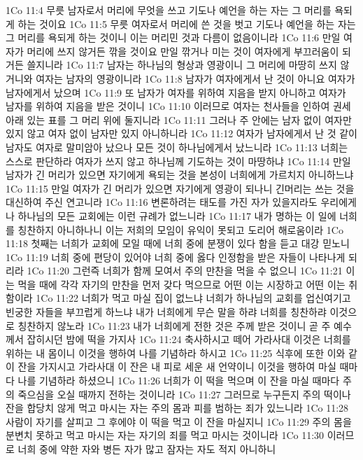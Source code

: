 1Co 11:4  무릇 남자로서 머리에 무엇을 쓰고 기도나 예언을 하는 자는 그 머리를 욕되게 하는 것이요
1Co 11:5  무릇 여자로서 머리에 쓴 것을 벗고 기도나 예언을 하는 자는 그 머리를 욕되게 하는 것이니 이는 머리민 것과 다름이 없음이니라
1Co 11:6  만일 여자가 머리에 쓰지 않거든 깎을 것이요 만일 깎거나 미는 것이 여자에게 부끄러움이 되거든 쓸지니라
1Co 11:7  남자는 하나님의 형상과 영광이니 그 머리에 마땅히 쓰지 않거니와 여자는 남자의 영광이니라
1Co 11:8  남자가 여자에게서 난 것이 아니요 여자가 남자에게서 났으며
1Co 11:9  또 남자가 여자를 위하여 지음을 받지 아니하고 여자가 남자를 위하여 지음을 받은 것이니
1Co 11:10  이러므로 여자는 천사들을 인하여 권세 아래 있는 표를 그 머리 위에 둘지니라
1Co 11:11  그러나 주 안에는 남자 없이 여자만 있지 않고 여자 없이 남자만 있지 아니하니라
1Co 11:12  여자가 남자에게서 난 것 같이 남자도 여자로 말미암아 났으나 모든 것이 하나님에게서 났느니라
1Co 11:13  너희는 스스로 판단하라 여자가 쓰지 않고 하나님께 기도하는 것이 마땅하냐
1Co 11:14  만일 남자가 긴 머리가 있으면 자기에게 욕되는 것을 본성이 너희에게 가르치지 아니하느냐
1Co 11:15  만일 여자가 긴 머리가 있으면 자기에게 영광이 되나니 긴머리는 쓰는 것을 대신하여 주신 연고니라
1Co 11:16  변론하려는 태도를 가진 자가 있을지라도 우리에게나 하나님의 모든 교회에는 이런 규례가 없느니라
1Co 11:17  내가 명하는 이 일에 너희를 칭찬하지 아니하나니 이는 저희의 모임이 유익이 못되고 도리어 해로움이라
1Co 11:18  첫째는 너희가 교회에 모일 때에 너희 중에 분쟁이 있다 함을 듣고 대강 믿노니
1Co 11:19  너희 중에 편당이 있어야 너희 중에 옳다 인정함을 받은 자들이 나타나게 되리라
1Co 11:20  그런즉 너희가 함께 모여서 주의 만찬을 먹을 수 없으니
1Co 11:21  이는 먹을 때에 각각 자기의 만찬을 먼저 갖다 먹으므로 어떤 이는 시장하고 어떤 이는 취함이라
1Co 11:22  너희가 먹고 마실 집이 없느냐 너희가 하나님의 교회를 업신여기고 빈궁한 자들을 부끄럽게 하느냐 내가 너희에게 무슨 말을 하랴 너희를 칭찬하랴 이것으로 칭찬하지 않노라
1Co 11:23  내가 너희에게 전한 것은 주께 받은 것이니 곧 주 예수께서 잡히시던 밤에 떡을 가지사
1Co 11:24  축사하시고 떼어 가라사대 이것은 너희를 위하는 내 몸이니 이것을 행하여 나를 기념하라 하시고
1Co 11:25  식후에 또한 이와 같이 잔을 가지시고 가라사대 이 잔은 내 피로 세운 새 언약이니 이것을 행하여 마실 때마다 나를 기념하라 하셨으니
1Co 11:26  너희가 이 떡을 먹으며 이 잔을 마실 때마다 주의 죽으심을 오실 때까지 전하는 것이니라
1Co 11:27  그러므로 누구든지 주의 떡이나 잔을 합당치 않게 먹고 마시는 자는 주의 몸과 피를 범하는 죄가 있느니라
1Co 11:28  사람이 자기를 살피고 그 후에야 이 떡을 먹고 이 잔을 마실지니
1Co 11:29  주의 몸을 분변치 못하고 먹고 마시는 자는 자기의 죄를 먹고 마시는 것이니라
1Co 11:30  이러므로 너희 중에 약한 자와 병든 자가 많고 잠자는 자도 적지 아니하니
